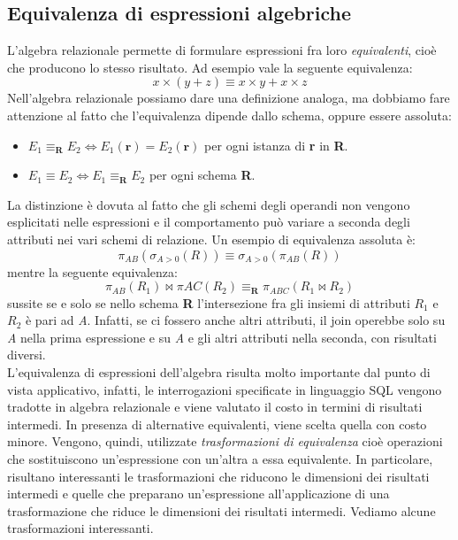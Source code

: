 \documentclass[12pt]{report}
\begin{document}
 	\subsection{Equivalenza di espressioni algebriche}
 	L'algebra relazionale permette di formulare espressioni fra loro \textit{equivalenti}, cioè che producono lo stesso risultato. Ad esempio vale la seguente equivalenza:
 	\[
	x \times (y + z) \equiv x \times y + x \times z
 	\]
 	Nell'algebra relazionale possiamo dare una definizione analoga, ma dobbiamo fare attenzione al fatto che l'equivalenza dipende dallo schema, oppure essere assoluta:
 	\begin{itemize}
 		\item $E_1 \equiv_\mathbf{R} E_2 \iff E_1(\mathbf{r}) = E_2(\mathbf{r})$ per ogni istanza di \textbf{r} in \textbf{R}.
 		\item $E_1 \equiv E_2 \iff E_1 \equiv_\mathbf{R} E_2$ per ogni schema \textbf{R}.
 	\end{itemize}
 	La distinzione è dovuta al fatto che gli schemi degli operandi non vengono esplicitati nelle espressioni e il comportamento può variare a seconda degli attributi nei vari schemi di relazione. Un esempio di equivalenza assoluta è:
 	\[
 	\pi_{AB}(\sigma_{A > 0}(R)) \equiv \sigma_{A > 0}(\pi_{AB}(R))
 	\]
 	mentre la seguente equivalenza:
 	\[
 	\pi_{AB}(R_1) \bowtie \pi{AC}(R_2) \equiv_{\mathbf{R}} \pi_{ABC}(R_1 \bowtie R_2)
 	\]
 	sussite se e solo se nello schema \textbf{R} l'intersezione fra gli insiemi di attributi $R_1$ e $R_2$ è pari ad \textit{A}. Infatti, se ci fossero anche altri attributi, il join operebbe solo su \textit{A} nella prima espressione e su \textit{A} e gli altri attributi nella seconda, con risultati diversi. \\
 	L'equivalenza di espressioni dell'algebra risulta molto importante dal punto di vista applicativo, infatti, le interrogazioni specificate in linguaggio SQL vengono tradotte in algebra relazionale e viene valutato il costo in termini di risultati intermedi. In presenza di alternative equivalenti, viene scelta quella con costo minore. Vengono, quindi, utilizzate \textit{trasformazioni di equivalenza} cioè operazioni che sostituiscono un'espressione con un'altra a essa equivalente. In particolare, risultano interessanti le trasformazioni che riducono le dimensioni dei risultati intermedi e quelle che preparano un'espressione all'applicazione di una trasformazione che riduce le dimensioni dei risultati intermedi. Vediamo alcune trasformazioni interessanti.
\end{document}

